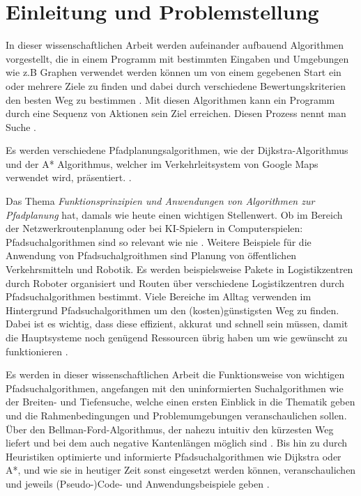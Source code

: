 \chapter{Einleitung und Problemstellung}
\label{Einleitung und Problemstellung}

In dieser wissenschaftlichen Arbeit werden aufeinander aufbauend Algorithmen vorgestellt, die in einem Programm mit bestimmten Eingaben und Umgebungen 
wie z.B Graphen verwendet werden können um von einem gegebenen Start ein oder mehrere Ziele zu finden und dabei durch verschiedene Bewertungskriterien den besten Weg zu bestimmen \cite{Esri:00}.
Mit diesen Algorithmen kann ein Programm durch eine Sequenz von Aktionen sein Ziel erreichen. Diesen Prozess nennt man Suche \cite[108,109]{Russell:10}.

Es werden verschiedene Pfadplanungsalgorithmen, wie der Dijkstra-Algorithmus und der A* Algorithmus, 
welcher im Verkehrleitsystem von Google Maps verwendet wird, präsentiert. \cite{Mehta:19}. 

Das Thema \emph{Funktionsprinzipien und Anwendungen von Algorithmen zur Pfadplanung} hat, damals wie heute einen wichtigen Stellenwert. 
Ob im Bereich der Netzwerkroutenplanung oder bei KI-Spielern in Computerspielen: Pfadsuchalgorithmen sind so relevant wie nie \cite{Foeada:21}. 
Weitere Beispiele für die Anwendung von Pfadsuchalgroithmen sind Planung von öffentlichen Verkehrsmitteln und 
Robotik. Es werden beispielsweise Pakete in Logistikzentren durch Roboter organisiert und Routen über verschiedene Logistikzentren durch Pfadsuchalgorithmen bestimmt.
Viele Bereiche im Alltag verwenden im Hintergrund Pfadsuchalgorithmen um den (kosten)günstigsten Weg zu finden. Dabei ist es wichtig, 
dass diese effizient, akkurat und schnell sein müssen, damit die Hauptsysteme noch genügend Ressourcen übrig haben um wie gewünscht zu funktionieren \cite{Foeada:21}. 

Es werden in dieser wissenschaftlichen Arbeit die Funktionsweise von wichtigen Pfadsuchalgorithmen, angefangen mit den uninformierten Suchalgorithmen wie der Breiten- und Tiefensuche, 
welche einen ersten Einblick in die Thematik geben und die Rahmenbedingungen und Problemumgebungen veranschaulichen sollen. 
Über den Bellman-Ford-Algorithmus, der nahezu intuitiv den kürzesten Weg liefert und bei dem auch negative Kantenlängen möglich sind \cite{Mukhlif:20}. 
Bis hin zu durch Heuristiken optimierte und informierte Pfadsuchalgorithmen wie Dijkstra oder A*, und wie sie in heutiger Zeit 
sonst eingesetzt werden können, veranschaulichen und jeweils (Pseudo-)Code- und Anwendungsbeispiele geben \cite[64]{Russell:10}.
